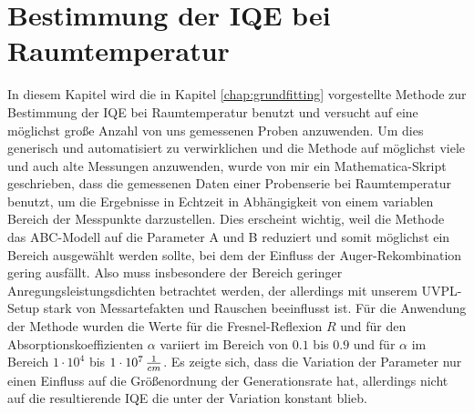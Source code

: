 \chapter{Bestimmung der IQE bei Raumtemperatur}

\label{chap:raum}
\thispagestyle{fancy}

In diesem Kapitel wird die in Kapitel \ref{chap:grundfitting} vorgestellte Methode zur Bestimmung der IQE bei Raumtemperatur benutzt und versucht auf eine möglichst große Anzahl von uns gemessenen Proben anzuwenden. 
\newline
Um dies generisch und automatisiert zu verwirklichen und die Methode auf möglichst viele und auch alte Messungen anzuwenden, wurde von mir ein Mathematica-Skript geschrieben, dass die gemessenen Daten einer Probenserie bei Raumtemperatur benutzt, um die Ergebnisse in Echtzeit in Abhängigkeit von einem variablen Bereich der Messpunkte darzustellen. Dies erscheint wichtig, weil die Methode das ABC-Modell auf die Parameter A und B reduziert und somit möglichst ein Bereich ausgewählt werden sollte, bei dem der Einfluss der Auger-Rekombination gering ausfällt. Also muss insbesondere der Bereich geringer Anregungsleistungsdichten betrachtet werden, der allerdings mit unserem UVPL-Setup stark von Messartefakten und Rauschen beeinflusst ist.
\newline
Für die Anwendung der Methode wurden die Werte für die Fresnel-Reflexion $R$ und für den Absorptionskoeffizienten $\alpha$ variiert im Bereich von 
$0.1$ bis $0.9$ und für $\alpha$ im Bereich $1\cdot 10^4$ bis $1\cdot 10^7 \thinspace \frac{1}{cm}$. Es zeigte sich, dass die Variation der Parameter nur einen Einfluss auf die Größenordnung der Generationsrate hat, allerdings nicht auf die resultierende IQE die unter der Variation konstant blieb. 
